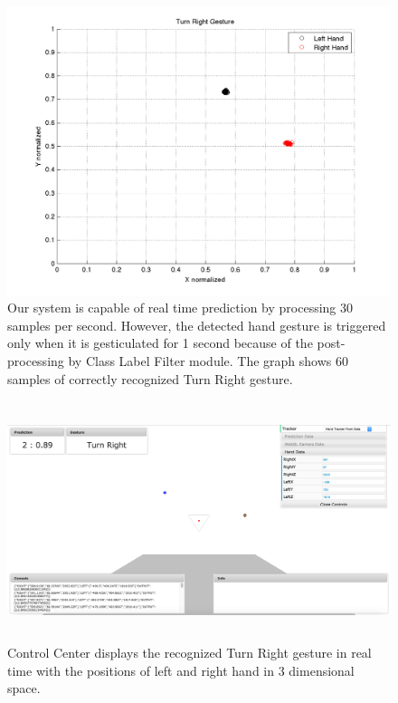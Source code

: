 \begin{figure}
	[h] \hspace{-15 mm} \centering 
	\includegraphics[width=155mm]{figures/result/test-turn-right.png} \caption{Our system is capable of real time prediction by processing 30 samples per second. However, the detected hand gesture is triggered only when it is gesticulated for 1 second because of the post-processing by Class Label Filter module. The graph shows 60 samples of correctly recognized Turn Right gesture. } \label{res:pl:turn:right} 
\end{figure}
\begin{figure}
	[h] \centering 
	\includegraphics[height=70mm]{figures/result/cc-turn-right.jpg} \caption{Control Center displays the recognized Turn Right gesture in real time with the positions of left and right hand in 3 dimensional space.} \label{res:cc:turn:right} 
\end{figure}
